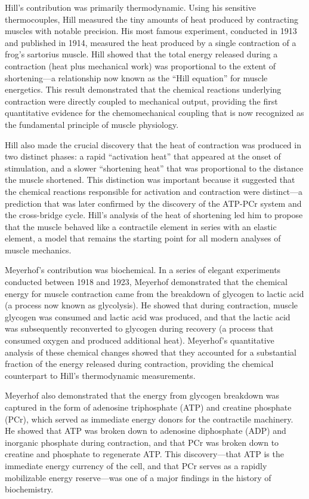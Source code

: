 Hill's contribution was primarily thermodynamic. Using his sensitive thermocouples, Hill measured the tiny amounts of heat produced by contracting muscles with notable precision. His most famous experiment, conducted in 1913 and published in 1914, measured the heat produced by a single contraction of a frog's sartorius muscle. Hill showed that the total energy released during a contraction (heat plus mechanical work) was proportional to the extent of shortening---a relationship now known as the ``Hill equation'' for muscle energetics. This result demonstrated that the chemical reactions underlying contraction were directly coupled to mechanical output, providing the first quantitative evidence for the chemomechanical coupling that is now recognized as the fundamental principle of muscle physiology.

Hill also made the crucial discovery that the heat of contraction was produced in two distinct phases: a rapid ``activation heat'' that appeared at the onset of stimulation, and a slower ``shortening heat'' that was proportional to the distance the muscle shortened. This distinction was important because it suggested that the chemical reactions responsible for activation and contraction were distinct---a prediction that was later confirmed by the discovery of the ATP-PCr system and the cross-bridge cycle. Hill's analysis of the heat of shortening led him to propose that the muscle behaved like a contractile element in series with an elastic element, a model that remains the starting point for all modern analyses of muscle mechanics.

Meyerhof's contribution was biochemical. In a series of elegant experiments conducted between 1918 and 1923, Meyerhof demonstrated that the chemical energy for muscle contraction came from the breakdown of glycogen to lactic acid (a process now known as glycolysis). He showed that during contraction, muscle glycogen was consumed and lactic acid was produced, and that the lactic acid was subsequently reconverted to glycogen during recovery (a process that consumed oxygen and produced additional heat). Meyerhof's quantitative analysis of these chemical changes showed that they accounted for a substantial fraction of the energy released during contraction, providing the chemical counterpart to Hill's thermodynamic measurements.

Meyerhof also demonstrated that the energy from glycogen breakdown was captured in the form of adenosine triphosphate (ATP) and creatine phosphate (PCr), which served as immediate energy donors for the contractile machinery. He showed that ATP was broken down to adenosine diphosphate (ADP) and inorganic phosphate during contraction, and that PCr was broken down to creatine and phosphate to regenerate ATP. This discovery---that ATP is the immediate energy currency of the cell, and that PCr serves as a rapidly mobilizable energy reserve---was one of a major findings in the history of biochemistry.

